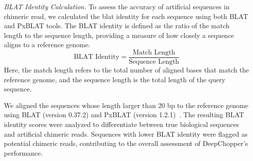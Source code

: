 \documentclass[pdflatex, sn-mathphys-num, lineno]{sn-jnl}%
\theoremstyle{thmstyleone}%
\theoremstyle{thmstyletwo}%
\theoremstyle{thmstylethree}%
\begin{document}
\textit{BLAT Identity Calculation.} To assess the accuracy of artificial sequences in chimeric read, we calculated the \gls{blat} identity for each sequence using both BLAT and PxBLAT tools.
The BLAT identity is defined as the ratio of the match length to the sequence length, providing a measure of how closely a sequence aligns to a reference genome.
\[
\textrm{BLAT Identity} = \frac{\textrm{Match Length}}{\textrm{Sequence Length}}
\]
Here, the match length refers to the total number of aligned bases that match the reference genome, and the sequence length is the total length of the query sequence.

We aligned the sequences whose length larger than 20 bp to the reference genome using BLAT (version 0.37.2) and PxBLAT (version 1.2.1)~\cite{kent2002blat, li2024pxblat}.
The resulting BLAT identity scores were analyzed to differentiate between true biological sequences and artificial chimeric reads.
Sequences with lower BLAT identity were flagged as potential chimeric reads, contributing to the overall assessment of DeepChopper's performance.





\end{document}
